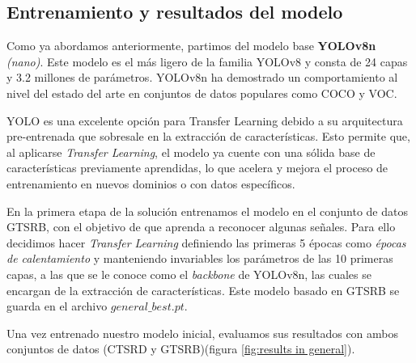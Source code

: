 \documentclass{article}
\begin{document}
\subsection{Entrenamiento y resultados del modelo}
Como ya abordamos anteriormente, partimos del modelo base \textbf{YOLOv8n} \textit{(nano)}. Este modelo es el más ligero de la familia YOLOv8 y consta de 24 capas y 3.2 millones de parámetros. YOLOv8n ha demostrado un comportamiento al nivel del estado del arte en conjuntos de datos populares como COCO y VOC. 

YOLO es una excelente opción para Transfer Learning debido a su arquitectura pre-entrenada que sobresale en la extracción de características. Esto permite que, al aplicarse \textit{Transfer Learning}, el modelo ya cuente con una sólida base de características previamente aprendidas, lo que acelera y mejora el proceso de entrenamiento en nuevos dominios o con datos específicos. 

En la primera etapa de la solución entrenamos el modelo en el conjunto de datos GTSRB, con el objetivo de que aprenda a reconocer algunas señales. Para ello decidimos hacer \textit{Transfer Learning} definiendo las primeras 5 épocas como \textit{épocas de calentamiento} y manteniendo invariables los parámetros de las 10 primeras capas, a las que se le conoce como el \textit{backbone} de YOLOv8n, las cuales se encargan de la extracción de características. Este modelo basado en GTSRB se guarda en el archivo $general\_best.pt$.

Una vez entrenado nuestro modelo inicial, evaluamos sus resultados con ambos conjuntos de datos (CTSRD y GTSRB)(figura \ref{fig:results in general}).
\end{document}
